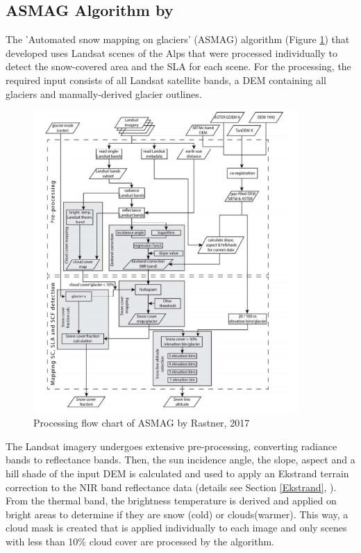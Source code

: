 \documentclass[12pt]{article}
\begin{document}
\subsection{ASMAG Algorithm by \cite{Rastner2017}}
\label{ASMAG}
The 'Automated snow mapping on glaciers' (ASMAG) algorithm (Figure \ref{fig:ASMAG}) that \cite{Rastner2017} developed uses Landsat scenes of the Alps that were processed individually to detect the snow-covered area and the SLA for each scene. For the processing, the required input consists of all Landsat satellite bands, a DEM containing all glaciers and manually-derived glacier outlines.\\
\begin{figure}[H]
\centering
\includegraphics[width=0.9\textwidth]{Rastner_ASMAG}
\caption{Processing flow chart of ASMAG by Rastner, 2017}
\label{fig:ASMAG}
\end{figure}
The Landsat imagery undergoes extensive pre-processing, converting radiance bands to reflectance bands. Then, the sun incidence angle, the slope, aspect and a hill shade of the input DEM is calculated and used to apply an Ekstrand terrain correction to the NIR band reflectance data (details see Section \ref{Ekstrand}, \cite{Ekstrand1996}).\\
From the thermal band, the brightness temperature is derived and applied on bright areas to determine if they are snow (cold) or clouds(warmer). This way, a cloud mask is created that is applied individually to each image and only scenes with less than 10\% cloud cover are processed by the algorithm.\\
\end{document}

